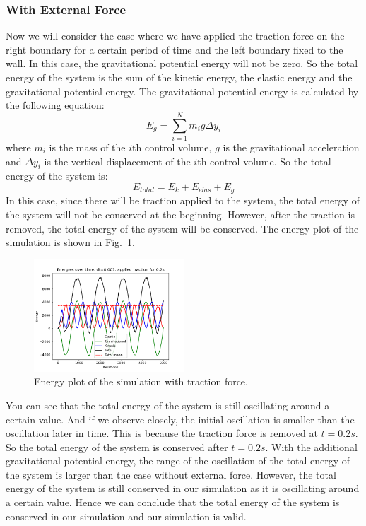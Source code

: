 \documentclass[acmtog]{acmart}
\begin{document}
\subsubsection{With External Force}
Now we will consider the case where we have applied the traction force on the right boundary for a certain period of time and the left boundary fixed to the wall. In this case, the gravitational potential energy will not be zero. So the total energy of the system is the sum of the kinetic energy, the elastic energy and the gravitational potential energy. The gravitational potential energy is calculated by the following equation:
\begin{equation*}
E_g = \sum_{i=1}^{N} m_i g \Delta y_i
\end{equation*}
where $m_i$ is the mass of the $i$th control volume, $g$ is the gravitational acceleration and $\Delta y_i$ is the vertical displacement of the $i$th control volume. So the total energy of the system is:
\begin{equation*}
E_{total} = E_k + E_{elas} + E_g
\end{equation*}
In this case, since there will be traction applied to the system, the total energy of the system will not be conserved at the beginning. However, after the traction is removed, the total energy of the system will be conserved. The energy plot of the simulation is shown in Fig.~\ref{fig:release}.

\begin{figure}[H]
  \centering
  \includegraphics[width=0.5\textwidth]{images/release.png}
  \caption{Energy plot of the simulation with traction force.}
  \label{fig:release}
\end{figure}

You can see that the total energy of the system is still oscillating around a certain value. And if we observe closely, the initial oscillation is smaller than the oscillation later in time. This is because the traction force is removed at $t=0.2s$. So the total energy of the system is conserved after $t=0.2s$. With the additional gravitational potential energy, the range of the oscillation of the total energy of the system is larger than the case without external force. However, the total energy of the system is still conserved in our simulation as it is oscillating around a certain value. Hence we can conclude that the total energy of the system is conserved in our simulation and our simulation is valid.
\end{document}
